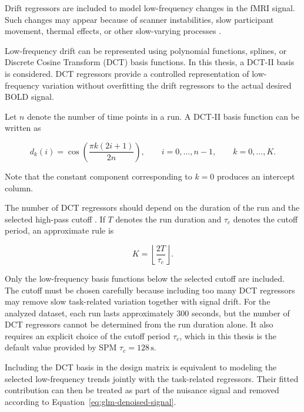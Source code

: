 \documentclass[english]{pwr_wmat_praca_dyplomowa}
\theoremstyle{definition}
\theoremstyle{remark}
\begin{document}
Drift regressors are included to model low-frequency changes in the fMRI signal. Such changes may appear because of scanner instabilities, slow participant movement, thermal effects, or other slow-varying processes \cite{drift-others}.

Low-frequency drift can be represented using polynomial functions, splines, or Discrete Cosine Transform (DCT) basis functions. In this thesis, a DCT-II basis is considered. DCT regressors provide a controlled representation of low-frequency variation without overfitting the drift regressors to the actual desired BOLD signal.

Let $n$ denote the number of time points in a run. A DCT-II basis function can be written as \cite{dct}

\begin{equation}
    d_k(i) = \cos \left(\frac{\pi k(2i+1)}{2n}\right), \qquad i=0,\ldots,n-1, \qquad k=0,\ldots,K.
\end{equation}

Note that the constant component corresponding to $k=0$ produces an intercept column.

The number of DCT regressors should depend on the duration of the run and the selected high-pass cutoff \cite{spm-filter}. If $T$ denotes the run duration and $\tau_c$ denotes the cutoff period, an approximate rule is

\begin{equation}
    K = \left\lfloor\frac{2T}{\tau_c}\right\rfloor.
\end{equation}

Only the low-frequency basis functions below the selected cutoff are included. The cutoff must be chosen carefully because including too many DCT regressors may remove slow task-related variation together with signal drift. For the analyzed dataset, each run lasts approximately 300 seconds, but the number of DCT regressors cannot be determined from the run duration alone. It also requires an explicit choice of the cutoff period $\tau_c$, which in this thesis is the default value provided by SPM \cite{spm-filter} $\tau_c = 128 \, \mathrm{s}$.

Including the DCT basis in the design matrix is equivalent to modeling the selected low-frequency trends jointly with the task-related regressors. Their fitted contribution can then be treated as part of the nuisance signal and removed according to Equation~\eqref{eq:glm-denoised-signal}.

\newpage
\end{document}

